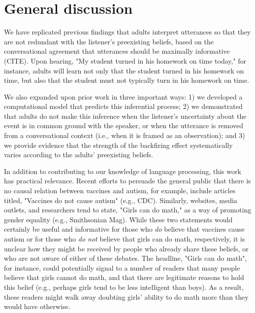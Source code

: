 \documentclass[10pt,letterpaper]{article}
\newcommand{\red}[1]{\textcolor{Red}{#1}}
\begin{document}




\section{General discussion}

We have replicated previous findings that adults interpret utterances so that they are not redundant with the listener's preexisting beliefs, based on the conversational agreement that utterances should be maximally informative (CITE).  Upon hearing, "My student turned in his homework on time today," for instance, adults will learn not only that the student turned in his homework on time, but also that the student must not typically turn in his homework on time.

We also expanded upon prior work in three important ways: 1) we developed a computational model that predicts this inferential process; 2) we demonstrated that adults do not make this inference when the listener's uncertainty about the event is in common ground with the speaker, or when the utterance is removed from a conversational context (i.e., when it is framed as an observation); and 3) we provide evidence that the strength of the backfiring effect systematically varies according to the adults' preexisting beliefs.

In addition to contributing to our knowledge of language processing, this work has practical relevance.  Recent efforts to persuade the general public that there is no causal relation between vaccines and autism, for example, include articles titled, "Vaccines do not cause autism" (e.g., CDC).  Similarly, websites, media outlets, and researchers tend to state, "Girls can do math," as a way of promoting gender equality (e.g., Smithsonian Mag).  While these two statements would certainly be useful and informative for those who \emph{do} believe that vaccines cause autism or for those who \emph{do not} believe that girls can do math, respectively, it is unclear how they might be received by people who already share these beliefs, or who are not aware of either of these debates.  The headline, "Girls can do math", for instance, could potentially signal to a number of readers that many people believe that girls cannot do math, and that there are legitimate reasons to hold this belief (e.g., perhaps girls tend to be less intelligent than boys).  As a result, these readers might walk away doubting girls' ability to do math more than they would have otherwise.
\end{document}
